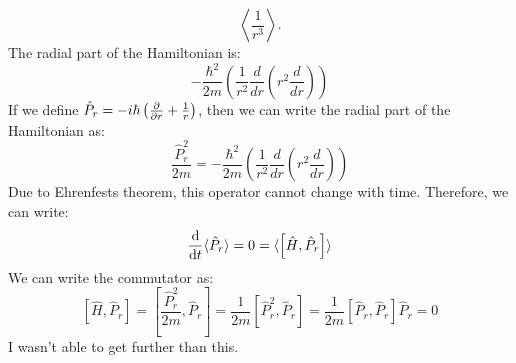 \documentclass[12pt]{article}
\begin{document}
\subsection{}
$$
\left\langle\frac{1}{r^{3}}\right\rangle .
$$
The radial part of the Hamiltonian is:
\begin{equation}
  -\frac{\hbar^2}{2m}\left(\frac{1}{r^2}\frac{d}{dr}\left(r^2\frac{d}{dr}\right)\right)
\end{equation}
If we define $\hat{P}_r = -i\hbar\left(\pdv{r}+\frac{1}{r}\right)$, then we can write the radial part of the Hamiltonian as:
\begin{equation}
 \frac{\hat{P}_r^2}{2m} = -\frac{\hbar^2}{2m}\left(\frac{1}{r^2}\frac{d}{dr}\left(r^2\frac{d}{dr}\right)\right)
\end{equation}
Due to Ehrenfests theorem, this operator cannot change with time. Therefore, we can write:
\begin{equation}
  \dv{t}\langle\hat{P}_r\rangle = 0 = \langle \left[\hat{H}, \hat{P}_r\right]\rangle
\end{equation}
We can write the commutator as:
\begin{equation}
  \left[\hat{H}, \hat{P}_r\right] = \left[\frac{\hat{P}_r^2}{2m}, \hat{P}_r\right] = \frac{1}{2m}\left[\hat{P}_r^2, \hat{P}_r\right] = \frac{1}{2m}\left[\hat{P}_r, \hat{P}_r\right]\hat{P}_r = 0
\end{equation}
I wasn't able to get further than this.
\end{document}
